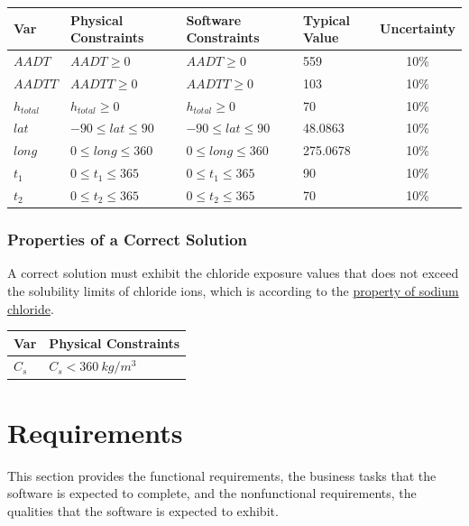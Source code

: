 \documentclass[12pt]{article}
\begin{document}
\begin{table}[!h]
  \caption{Input Variables} \label{TblInputVar}
  \renewcommand{\arraystretch}{1.2}
\noindent \begin{longtable*}{l l l l c} 
  \toprule
  \textbf{Var} & \textbf{Physical Constraints} & \textbf{Software Constraints} &
                             \textbf{Typical Value} & \textbf{Uncertainty}\\
  \midrule 
  $AADT$ & $AADT \ge 0$ & $AADT \ge 0$ & 559 & 10\%  \\
  $AADTT$ & $AADTT \ge 0$ & $AADTT \ge 0$ & 103  & 10\%
  \\
  $h_{total}$ & $h_{total} \ge 0$ & $h_{total} \ge 0$ &  70  & 10\%
  \\
  $lat$ & $-90 \leq lat \leq 90$ & $-90 \leq lat \leq 90$ & 48.0863 & 10\%
  \\
  $long$ & $0 \leq long \leq 360$ & $0 \leq long \leq 360$ &  275.0678 & 10\%
  \\
  $t_1$ & $0 \leq t_1 \leq 365$ & $0 \leq t_1 \leq 365$ &  90  & 10\%
  \\
  $t_2$ & $0 \leq t_2 \leq 365$ & $0 \leq t_2 \leq 365$ &  70  & 10\%
  \\
  \bottomrule
\end{longtable*}
\end{table}

\noindent 
\subsubsection{Properties of a Correct Solution} \label{sec_CorrectSolution}

\noindent
A correct solution must exhibit the chloride exposure values that does not exceed the solubility limits of chloride ions, which is according to the \href{https://en.m.wikipedia.org/wiki/Sodium_chloride}{property of sodium chloride}.
\begin{table}[!h]
\caption{Output Variables} \label{TblOutputVar}
\renewcommand{\arraystretch}{1.2}
\noindent \begin{longtable*}{l l} 
  \toprule
  \textbf{Var} & \textbf{Physical Constraints} \\
  \midrule 
  $C_s$ & $C_s < 360 ~ kg/m^3$  \\
  
   \bottomrule
\end{longtable*}
\end{table}

\newpage
\section{Requirements}
This section provides the functional requirements, the business tasks that the
software is expected to complete, and the nonfunctional requirements, the
qualities that the software is expected to exhibit.
\end{document}
